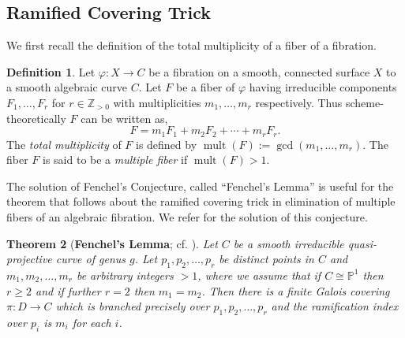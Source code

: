 \documentclass[12pt,reqno,twoside]{amsart}
\newtheorem{theorem}{Theorem}[section]
\theoremstyle{definition}
\newtheorem{definition}[theorem]{Definition}
\numberwithin{equation}{section}
\newcommand{\Z}{\mathbb{Z}}
\newcommand{\PP}{\mathbb{P}}
\newcommand{\mult}{\operatorname{mult}}
\begin{document}
\subsection{Ramified Covering Trick}
We first recall the definition of the total multiplicity of a fiber of a fibration.
\begin{definition}
	Let $\varphi: X \to C$ be a fibration on a smooth, connected surface $X$ to a smooth algebraic curve $C$. Let $F$ be a fiber of $\varphi$ having irreducible components $F_1, \ldots, F_r$ for $r\in \Z_{>0}$ with multiplicities $m_1,\ldots, m_r$ respectively. Thus scheme-theoretically $F$ can be written as, $$F=m_1F_1+m_2F_2+\cdots+m_rF_r.$$
	The \emph{total multiplicity} of $F$ is defined by $\mult(F):=\gcd(m_1,\ldots, m_r)$. The fiber $F$ is said to be a \emph{multiple fiber} if $\mult(F)>1$.
\end{definition}
The solution of Fenchel's Conjecture, called ``Fenchel's Lemma'' is useful for the theorem that follows about the ramified covering trick in elimination of multiple fibers of an algebraic fibration. We refer \cite{Cha1983} for the solution of this conjecture. 

\begin{theorem}[{{\bf Fenchel's Lemma}; cf. \cite{Cha1983}}]\label{Fenchel's Conjecture}
	Let $C$ be a smooth irreducible quasi-projective curve of genus $g$. Let $p_1, p_2, \ldots, p_r$ be distinct points in $C$ and $m_1, m_2, \ldots, m_r$ be arbitrary integers $>1$, where we assume that if $C \cong \PP^1$ then $r\geq 2$ and if further $r=2$ then $m_1=m_2$. Then there is a finite Galois covering $\pi : D \to C$ which is branched precisely over $p_1, p_2, \ldots, p_r$ and the ramification index over $p_i$ is $m_i$ for each $i$.
\end{theorem}
\end{document}
